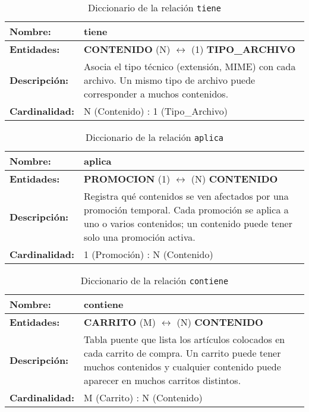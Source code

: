 \begin{longtable}{|p{3.5cm}|p{10cm}|}
\caption{Diccionario de la relación \texttt{tiene}}
\label{tab:rel_tiene_tipo} \\ \hline
\textbf{Nombre:} & tiene \\ \hline
\textbf{Entidades:} & \textbf{CONTENIDO} (N) $\longleftrightarrow$ (1) \textbf{TIPO\_ARCHIVO} \\ \hline
\textbf{Descripción:} & Asocia el tipo técnico (extensión, MIME) con cada archivo.  
Un mismo tipo de archivo puede corresponder a muchos contenidos. \\ \hline
\textbf{Cardinalidad:} & N (Contenido) : 1 (Tipo\_Archivo) \\ \hline
\end{longtable}

\begin{longtable}{|p{3.5cm}|p{10cm}|}
\caption{Diccionario de la relación \texttt{aplica}}
\label{tab:rel_aplica} \\ \hline
\textbf{Nombre:} & aplica \\ \hline
\textbf{Entidades:} & \textbf{PROMOCION} (1) $\longleftrightarrow$ (N) \textbf{CONTENIDO} \\ \hline
\textbf{Descripción:} & Registra qué contenidos se ven afectados por una promoción temporal.  
Cada promoción se aplica a uno o varios contenidos; un contenido puede tener solo una promoción activa. \\ \hline
\textbf{Cardinalidad:} & 1 (Promoción) : N (Contenido) \\ \hline
\end{longtable}

\begin{longtable}{|p{3.5cm}|p{10cm}|}
\caption{Diccionario de la relación \texttt{contiene}}
\label{tab:rel_contiene} \\ \hline
\textbf{Nombre:} & contiene \\ \hline
\textbf{Entidades:} & \textbf{CARRITO} (M) $\longleftrightarrow$ (N) \textbf{CONTENIDO} \\ \hline
\textbf{Descripción:} & Tabla puente que lista los artículos colocados en cada carrito de compra.  
Un carrito puede tener muchos contenidos y cualquier contenido puede aparecer en muchos carritos distintos. \\ \hline
\textbf{Cardinalidad:} & M (Carrito) : N (Contenido) \\ \hline
\end{longtable}

